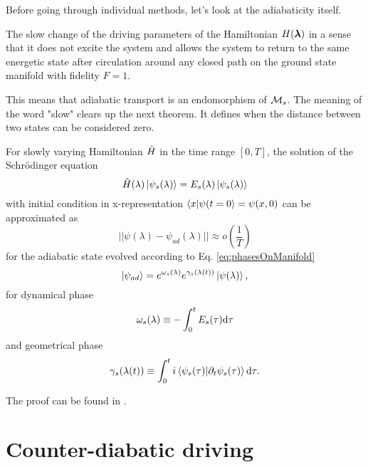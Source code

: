 Before going through individual methods, let's look at the adiabaticity itself.

\begin{definition}[Adibaticity]
    The slow change of the driving parameters of the Hamiltonian $H({\bm\lambda})$ in a sense that it does not excite the system and allows the system to return to the same energetic state after circulation around any closed path on the ground state manifold with fidelity $F=1$. 
\end{definition}
This means that adiabatic transport is an endomorphism of $\mathcal{M} _s$. The meaning of the word "slow" clears up the next theorem. It defines when the distance between two states can be considered zero.
\begin{thm}
    \label{adiabaticTheorem}
    For slowly varying Hamiltonian $\hat{H}$ in the time range $[0,T]$, the solution of the Schrödinger equation 
    $$\hat{H}(\lambda)\ket{\psi_s(\lambda)} = E_s(\lambda)\ket{\psi_s(\lambda)}$$
    with initial condition in x-representation $\braket{x|\psi(t=0}=\psi(x,0)$ can be approximated as
    \begin{equation}
      ||\psi(\lambda) - \psi_{ad}(\lambda)||\approx o\left(\frac{1}{T}\right)
    \end{equation}
    for the adiabatic state evolved according to Eq. \ref{eq:phasesOnManifold}
    \begin{equation}
        \ket{\psi_{ad}}= e^{\omega_s(\lambda)}e^{\gamma_s(\lambda(t))}\ket{\psi(\lambda)},
    \end{equation}
    for dynamical phase
    $$\omega_s(\lambda)\equiv -\int_0^t E_s(\tau)\mathrm{d} \tau$$
    and geometrical phase
        $$\gamma_s(\lambda(t))\equiv \int_0^t i\braket{\psi_s(\tau)|\partial_t\psi_s(\tau)} \mathrm{d} \tau .$$
\end{thm}
\begin{myproof}
    The proof can be found in \citet[Chap. 6]{sakurai}.
\end{myproof}














\section{Counter-diabatic driving}

